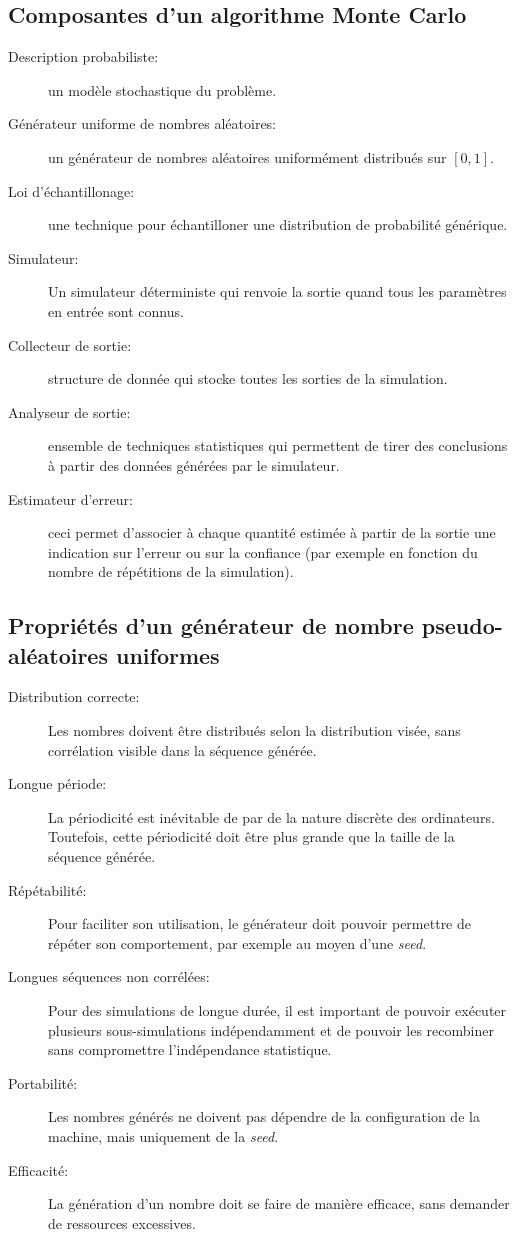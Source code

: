 \documentclass[a4paper]{article}
\begin{document}
\subsection{Composantes d'un algorithme Monte Carlo}
\begin{description}
	\item[Description probabiliste:] un modèle stochastique du problème.
	\item[Générateur uniforme de nombres aléatoires:]un générateur de
		nombres aléatoires uniformément distribués sur \([0,1]\).
	\item[Loi d'échantillonage:]une technique pour échantilloner une
		distribution de probabilité générique.
	\item[Simulateur:]Un simulateur déterministe qui renvoie la sortie
		quand tous les paramètres en entrée sont connus.
	\item[Collecteur de sortie:]structure de donnée qui stocke toutes
		les sorties de la simulation.
	\item[Analyseur de sortie:]ensemble de techniques statistiques qui
		permettent de tirer des conclusions à partir des données
		générées par le simulateur.
	\item[Estimateur d'erreur:]ceci permet d'associer à chaque quantité
		estimée à partir de la sortie une indication sur l'erreur ou sur
		la confiance (par exemple en fonction du nombre de répétitions
		de la simulation).
\end{description}

\subsection{Propriétés d'un générateur de nombre pseudo-aléatoires uniformes}
\begin{description}
	\item[Distribution correcte:]Les nombres doivent être distribués
		selon la distribution visée, sans corrélation visible dans la
		séquence générée.
	\item[Longue période:] La périodicité est inévitable de par de la
		nature discrète des ordinateurs. Toutefois, cette périodicité
		doit être plus grande que la taille de la séquence générée.
	\item[Répétabilité:]Pour faciliter son utilisation, le générateur
		doit pouvoir permettre de répéter son comportement, par exemple
		au moyen d'une \emph{seed}.
	\item[Longues séquences non corrélées:]Pour des simulations de
		longue durée, il est important de pouvoir exécuter plusieurs
		sous-simulations indépendamment et de pouvoir les recombiner
		sans compromettre l'indépendance statistique.
	\item[Portabilité:]Les nombres générés ne doivent pas dépendre de la
		configuration de la machine, mais uniquement de la \emph{seed}.
	\item[Efficacité:]La génération d'un nombre doit se faire de manière
		efficace, sans demander de ressources excessives.
\end{description}
\end{document}
